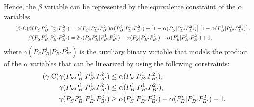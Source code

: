 \documentclass[a4paper]{elsarticle}
\begin{document}
\newcommand{\gammaprod}[4]{\gamma(#1#2|#3#4)}

Hence, the $\beta$ variable can be represented by the equivalence constraint of the $\alpha$ variables
\begin{align*}\tag{$\beta$-C}\label{eq:betaC}
\betamas{P_S^{}}{P_B^i}{P_{B'}^1}{P_{B'}^2}&=\alphamas{P_S^{}}{P_{B'}^1}{P_{B'}^2}\alphamas{P_B^i}{P_{B'}^1}{P_{B'}^2} + \left[1-\alphamas{P_S^{}}{P_{B'}^1}{P_{B'}^2}\right]\left[1-\alphamas{P_B^i}{P_{B'}^1}{P_{B'}^2}\right],\\
\betamas{P_S^{}}{P_B^i}{P_{B'}^1}{P_{B'}^2}&=2\gammaprod{P_S^{}}{P_B^i}{P_{B'}^1}{P_{B'}^2} -\alphamas{P_S^{}}{P_{B'}^1}{P_{B'}^2}-\alphamas{P_B^i}{P_{B'}^1}{P_{B'}^2}+1,
\end{align*}
where $\gammaprod{P_S^{}}{P_B^i}{P_{B'}^1}{P_{B'}^2}$ is the auxiliary binary variable that models the product of the $\alpha$ variables that can be linearized by using the following constraints:
\begin{align*}\tag{$\gamma$-C}\label{eq:gammaC}
\gammaprod{P_S^{}}{P_B^i}{P_{B'}^1}{P_{B'}^2} & \leq \alphamas{P_S^{}}{P_{B'}^1}{P_{B'}^2},\\
\gammaprod{P_S^{}}{P_B^i}{P_{B'}^1}{P_{B'}^2} & \leq \alphamas{P_B^i}{P_{B'}^1}{P_{B'}^2},\\
\gammaprod{P_S^{}}{P_B^i}{P_{B'}^1}{P_{B'}^2} & \geq \alphamas{P_S^{}}{P_{B'}^1}{P_{B'}^2} + \alphamas{P_B^i}{P_{B'}^1}{P_{B'}^2} - 1.
\end{align*}
 

\newcommand{\deltacheck}[4]{\delta(#1#2|#3#4)}
\end{document}
